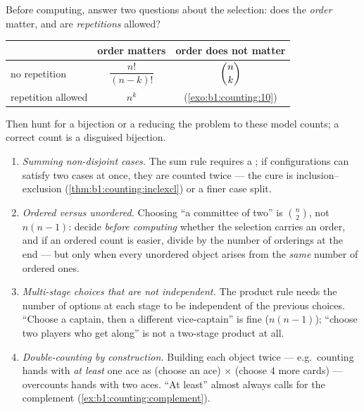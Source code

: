 \begin{method}\label{met:b1:counting:which}
Before computing, answer two questions about the selection: does the
\emph{order} matter, and are \emph{repetitions} allowed?
\begin{center}
\renewcommand{\arraystretch}{1.4}
\begin{tabular}{l|c|c}
 & order matters & order does not matter \\
\hline
no repetition & $\dfrac{n!}{(n-k)!}$ & $\dbinom{n}{k}$ \\[6pt]
repetition allowed & $n^k$ & (\cref{exo:b1:counting:10}) \\
\end{tabular}
\end{center}
Then hunt for a bijection or a  reducing the problem to these
model counts; a correct count is a disguised bijection.
\end{method}

\begin{remark}\label{rem:b1:counting:pitfalls}
\begin{enumerate}
  \item \emph{Summing non-disjoint cases.} The sum rule requires a
        ; if configurations can satisfy two cases at
        once, they are counted twice --- the cure is
        inclusion--exclusion (\cref{thm:b1:counting:inclexcl}) or
        a finer case split.
  \item \emph{Ordered versus unordered.} Choosing ``a committee of
        two'' is $\binom n2$, not $n(n-1)$: decide \emph{before
        computing} whether the selection carries an order, and if
        an ordered count is easier, divide by the number of
        orderings at the end --- but only when every unordered
        object arises from the \emph{same} number of ordered ones.
  \item \emph{Multi-stage choices that are not independent.}
        The product rule needs the number of options at each stage
        to be independent of the previous choices. ``Choose a
        captain, then a different vice-captain'' is fine ($n(n-1)$);
        ``choose two players who get along'' is not a two-stage
        product at all.
  \item \emph{Double-counting by construction.} Building each
        object twice --- e.g.\ counting hands with \emph{at least}
        one ace as (choose an ace) $\times$ (choose $4$ more
        cards) --- overcounts hands with two aces. ``At least''
        almost always calls for the complement
        (\cref{ex:b1:counting:complement}).
\end{enumerate}
\end{remark}

